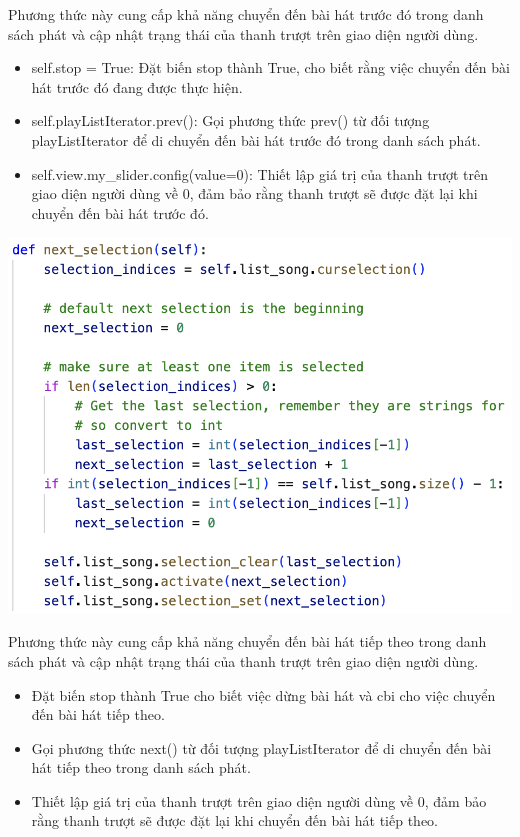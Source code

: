 \documentclass[a4paper]{article}
\begin{document}
\hspace*{0.5} Phương thức này cung cấp khả năng chuyển đến bài hát trước đó trong danh sách phát và cập nhật trạng thái của thanh trượt trên giao diện người dùng.

\begin{itemize}
    \item self.stop = True: Đặt biến stop thành True, cho biết rằng việc chuyển đến bài hát trước đó đang được thực hiện.
    \item self.playListIterator.prev(): Gọi phương thức prev() từ đối tượng playListIterator để di chuyển đến bài hát trước đó trong danh sách phát.
    \item self.view.my\_slider.config(value=0): Thiết lập giá trị của thanh trượt trên giao diện người dùng về 0, đảm bảo rằng thanh trượt sẽ được đặt lại khi chuyển đến bài hát trước đó.
\end{itemize}

\begin{center}
\includegraphics[width=175mm]{template_SGU 2/audio_next.png}
\end{center}

\hspace*{0.5} Phương thức này cung cấp khả năng chuyển đến bài hát tiếp theo trong danh sách phát và cập nhật trạng thái của thanh trượt trên giao diện người dùng.

\begin{itemize}
    \item Đặt biến stop thành True cho biết việc dừng bài hát và cbi cho việc chuyển đến bài hát tiếp theo.
    \item Gọi phương thức next() từ đối tượng playListIterator để di chuyển đến bài hát tiếp theo trong danh sách phát.
    \item Thiết lập giá trị của thanh trượt trên giao diện người dùng về 0, đảm bảo rằng thanh trượt sẽ được đặt lại khi chuyển đến bài hát tiếp theo.
\end{itemize}
\end{document}
